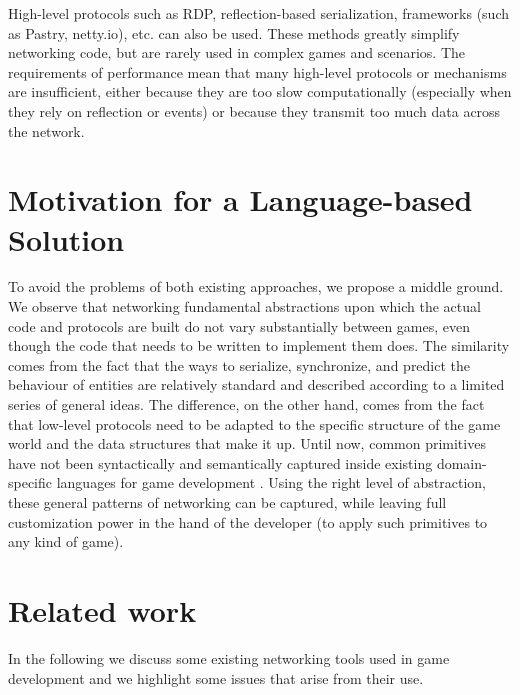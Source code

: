 High-level protocols such as RDP, reflection-based serialization, frameworks (such as Pastry, netty.io), etc. can also be used. These methods greatly simplify networking code, but are rarely used in complex games and scenarios. The requirements of performance mean that many high-level protocols or mechanisms are insufficient, either because they are too slow computationally (especially when they rely on reflection or events) or because they transmit too much data across the network.

\section{Motivation for a Language-based Solution}

To avoid the problems of both existing approaches, we propose a middle ground. We observe that networking fundamental abstractions upon which the actual code and protocols are built do not vary substantially between games, even though the code that needs to be written to implement them does. The similarity comes from the fact that the ways to serialize, synchronize, and predict the behaviour of entities are relatively standard and described according to a limited series of general ideas. The difference, on the other hand, comes from the fact that low-level protocols need to be adapted to the specific structure of the game world and the data structures that make it up. Until now, common primitives have not been syntactically and semantically captured inside existing domain-specific languages for game development \cite{bhatti2009domain}. Using the right level of abstraction, these general patterns of networking can be captured, while leaving full customization power in the hand of the developer (to apply such primitives to any kind of game).

\section{Related work}
In the following we discuss some existing networking tools used in game development and we highlight some issues that arise from their use.


